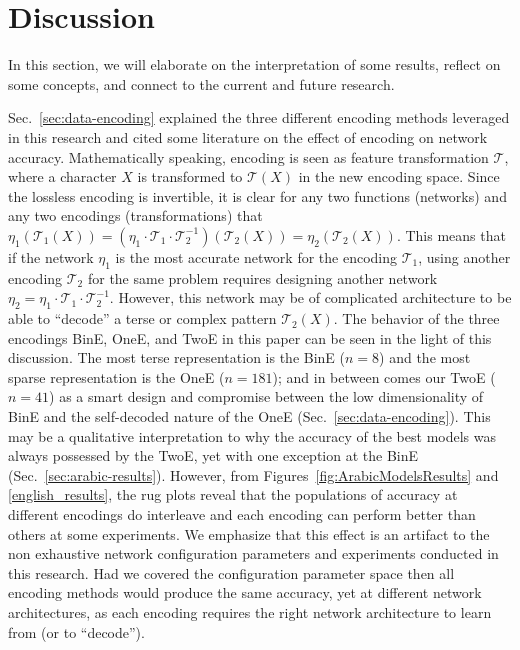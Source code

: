 \section{Discussion}\label{sec:discussion}
In this section, we will elaborate on the interpretation of some results, reflect on some concepts,
and connect to the current and future research.

Sec.~\ref{sec:data-encoding} explained the three different encoding methods leveraged in this
research and cited some literature on the effect of encoding on network accuracy. Mathematically
speaking, encoding is seen as feature transformation $\mathcal{T}$, where a character $X$ is
transformed to $\mathcal{T}(X)$ in the new encoding space. Since the lossless encoding is
invertible, it is clear for any two functions (networks) and any two encodings (transformations)
that
$\eta_1\left(\mathcal{T}_1(X)\right) = \left(\eta_1\cdot\mathcal{T}_1\cdot
  \mathcal{T}_2^{-1}\right)\left(\mathcal{T}_2(X)\right) =
\eta_2\left(\mathcal{T}_2(X)\right)$. This means that if the network $\eta_1$ is the most accurate
network for the encoding $\mathcal{T}_1$, using another encoding $\mathcal{T}_2$ for the same
problem requires designing another network
$\eta_2 = \eta_1\cdot\mathcal{T}_1\cdot \mathcal{T}_2^{-1}$. However, this network may be of
complicated architecture to be able to ``decode'' a terse or complex pattern $\mathcal{T}_2(X)$. The
behavior of the three encodings BinE, OneE, and TwoE in this paper can be seen in the light of this
discussion. The most terse representation is the BinE ($n=8$) and the most sparse representation is
the OneE ($n=181$); and in between comes our TwoE ($n=41$) as a smart design and compromise between
the low dimensionality of BinE and the self-decoded nature of the OneE
(Sec.~\ref{sec:data-encoding}). This may be a qualitative interpretation to why the accuracy of the
best models was always possessed by the TwoE, yet with one exception at the BinE
(Sec.~\ref{sec:arabic-results}). However, from Figures~\ref{fig:ArabicModelsResults} and
\ref{english_results}, the rug plots reveal that the populations of accuracy at different
encodings do interleave and each encoding can perform better than others at some experiments. We
emphasize that this effect is an artifact to the non exhaustive network configuration parameters and
experiments conducted in this research. Had we covered the configuration parameter space then all
encoding methods would produce the same accuracy, yet at different network architectures, as each
encoding requires the right network architecture to learn from (or to ``decode'').


